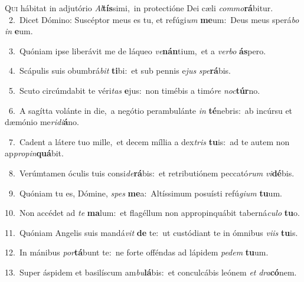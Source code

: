 \lettrine{\initial\textcolor{\initialcolor}{Q}}{ui} hábitat in adjutório \textit{Al}\-\textbf{tís}simi,~\star in protectióne Dei cæli \textit{com}\-\textit{mo}\textbf{rá}bitur.\\
{\numbfont\textcolor{\numbcolor}{~2.}}~Dicet Dómino: Suscéptor meus es tu, et refúgi\textit{um} \textbf{me}\-um:~\star Deus meus sperá\textit{bo} \textit{in} \textbf{e}\-um.\par
{\numbfont\textcolor{\numbcolor}{~3.}}~Quóniam ipse liberávit me de láqueo \textit{ve}\-\textbf{nán}tium,~\star et a \textit{ver}\-\textit{bo} \textbf{ás}\-pero.\par
{\numbfont\textcolor{\numbcolor}{~4.}}~Scápulis suis obumbrá\textit{bit} \textbf{ti}\-bi:~\star et sub pennis e\textit{jus} \textit{spe}\-\textbf{rá}bis.\par
{\numbfont\textcolor{\numbcolor}{~5.}}~Scuto circúmdabit te véri\textit{tas} \textbf{e}\-jus:~\star non timébis a timó\textit{re} \textit{noc}\-\textbf{túr}no.\par
{\numbfont\textcolor{\numbcolor}{~6.}}~A sagítta volánte in die,~\dagger a negótio perambulánte \textit{in} \textbf{té}\-nebris:~\star ab incúrsu et dæmónio me\-\textit{ri}\-\textit{di}\textbf{á}no.\par
{\numbfont\textcolor{\numbcolor}{~7.}}~Cadent a látere tuo mille,~\dagger et decem míllia a dex\textit{tris} \textbf{tu}\-is:~\star ad te autem non ap\-\textit{pro}\-\textit{pin}\textbf{quá}bit.\par
{\numbfont\textcolor{\numbcolor}{~8.}}~Verúmtamen óculis tuis consi\-\textit{de}\-\textbf{rá}bis:~\star et retributiónem peccató\textit{rum} \textit{vi}\-\textbf{dé}bis.\par
{\numbfont\textcolor{\numbcolor}{~9.}}~Quóniam tu es, Dómine, \textit{spes} \textbf{me}\-a:~\star Altíssimum posuísti refú\-\textit{gi}\-\textit{um} \textbf{tu}\-um.\par
{\numbfont\textcolor{\numbcolor}{10.}}~Non accédet ad \textit{te} \textbf{ma}\-lum:~\star et flagéllum non appropinquábit taberná\-\textit{cu}\-\textit{lo} \textbf{tu}\-o.\par
{\numbfont\textcolor{\numbcolor}{11.}}~Quóniam Angelis suis mandá\textit{vit} \textbf{de} te:~\star ut custódiant te in ómnibus \textit{vi}\-\textit{is} \textbf{tu}\-is.\par
{\numbfont\textcolor{\numbcolor}{12.}}~In mánibus \textit{por}\-\textbf{tá}bunt te:~\star ne forte offéndas ad lápidem \textit{pe}\-\textit{dem} \textbf{tu}\-um.\par
{\numbfont\textcolor{\numbcolor}{13.}}~Super áspidem et basilíscum am\-\textit{bu}\-\textbf{lá}bis:~\star et conculcábis leónem \textit{et} \textit{dra}\-\textbf{có}nem.\par
